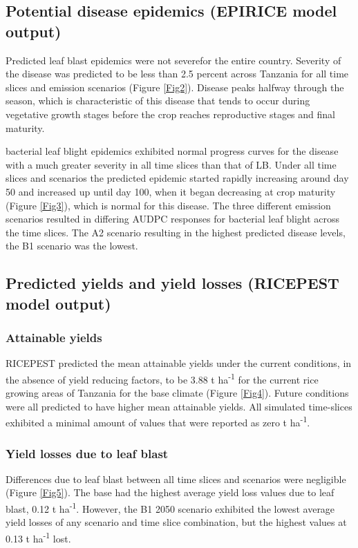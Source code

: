 \subsection{Potential disease epidemics (EPIRICE model output)}
\label{potential_epidemics}
    Predicted leaf blast epidemics were not severefor the entire country. Severity of the disease was predicted to be less than 2.5 percent across Tanzania for all time slices and emission scenarios (Figure \ref{Fig2}). Disease peaks halfway through the season, which is characteristic of this disease that tends to occur during vegetative growth stages before the crop reaches reproductive stages and final maturity.
    
    bacterial leaf blight epidemics exhibited normal progress curves for the disease with a much greater severity in all time slices than that of LB. Under all time slices and scenarios the predicted epidemic started rapidly increasing around day 50 and increased up until day 100, when it began decreasing at crop maturity (Figure \ref{Fig3}), which is normal for this disease. The three different emission scenarios resulted in differing AUDPC responses for bacterial leaf blight across the time slices. The A2 scenario resulting in the highest predicted disease levels, the B1 scenario was the lowest.
        
    \subsection{Predicted yields and yield losses (RICEPEST model output)}
    \label{predicted_yields}
    \subsubsection{Attainable yields}
    \label{attainable_yields}
    RICEPEST predicted the mean attainable yields under the current conditions, in the absence of yield reducing factors, to be 3.88 t ha\textsuperscript{-1} for the current rice growing areas of Tanzania for the base climate (Figure \ref{Fig4}). Future conditions were all predicted to have higher mean attainable yields. All simulated time-slices exhibited a minimal amount of values that were reported as zero t ha\textsuperscript{-1}.
    
    \subsubsection{Yield losses due to leaf blast}
    \label{lb_yield_losses}
    Differences due to leaf blast between all time slices and scenarios were negligible (Figure \ref{Fig5}). The base had the highest average yield loss values due to leaf blast, 0.12 t ha\textsuperscript{-1}. However, the B1 2050 scenario exhibited the lowest average yield losses of any scenario and time slice combination, but the highest values at 0.13 t ha\textsuperscript{-1} lost.
       
